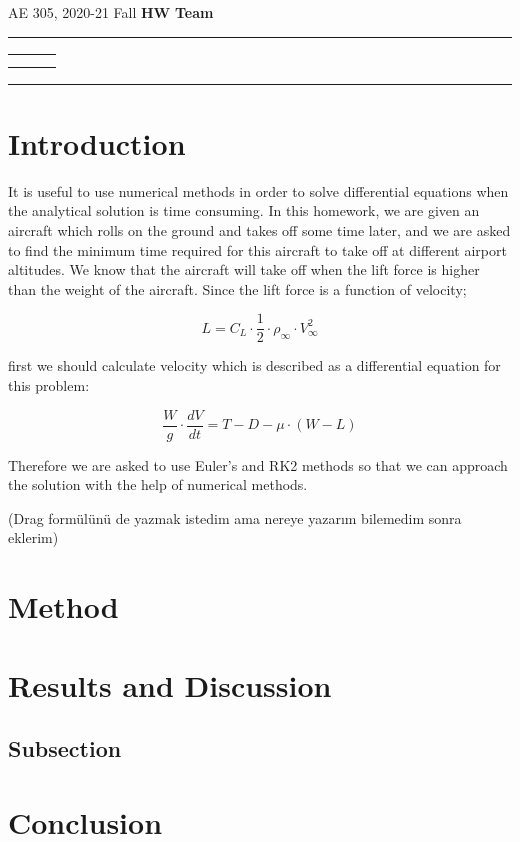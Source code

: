 \documentclass[letterpaper,12pt]{article}
\begin{document}
\begin{center}
AE 305, 2020-21 Fall \hfill \textbf{HW \HWno} \hfill \textbf{Team \TeamNo} \\
\noindent\rule{\textwidth}{0.4pt}
\begin{tabular}{p{} | p{} | p{} }
	\AuthorOneName&\AuthorTwoName&\AuthorThreeName\\
	\textit{\AuthorOneID}&\textit{\AuthorTwoID}&\textit{\AuthorThreeID}
\end{tabular}
\noindent\rule{\textwidth}{0.4pt}
\end{center}


\section{Introduction}

It is useful to use numerical methods in order to solve differential equations when
the analytical solution is time consuming. In this homework, we are given an aircraft
which rolls on the ground and takes off some time later, and we are asked to find
the minimum time required for this aircraft to take off at different airport altitudes.
We know that the aircraft will take off when the lift force is higher than the weight of
the aircraft. Since the lift force is a function of velocity;

\begin{equation}
        L = C_L \cdot \frac{1}{2} \cdot \rho_{\infty} \cdot V_{\infty}^{2}
\end{equation}

first we should calculate velocity which is described as a differential equation for
this problem:

\begin{equation}
        \frac{W}{g} \cdot \frac{dV}{dt} = T - D - \mu \cdot (W - L)
\end{equation}

Therefore we are asked to use Euler's and RK2 methods so that we can approach the
solution with the help of numerical methods.

(Drag formülünü de yazmak istedim ama nereye yazarım bilemedim sonra eklerim)

\section{Method}

\newpage

\section{Results and Discussion}

\subsection{Subsection}

\section{Conclusion}
\end{document}
